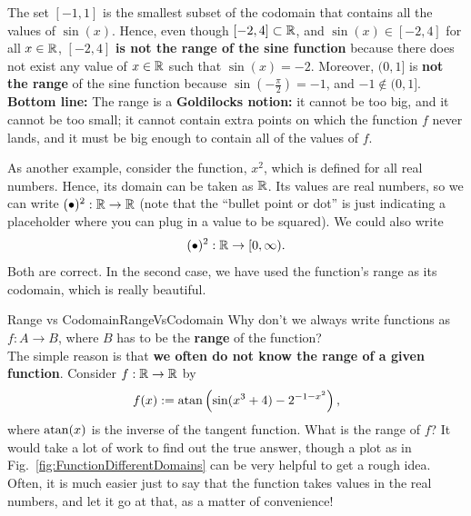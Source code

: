 The set $[-1, 1]$ is the smallest subset of the codomain that contains all the values of $\sin(x)$. Hence, even though $[-2, 4] \subset \mathbb R$, and $\sin(x) \in [-2, 4]$ for all $x\in \mathbb R$,  $[-2, 4]$ \textbf{is not the range of the sine function} because there does not exist any value of $x\in \mathbb R$ such that $\sin(x) = -2$. Moreover, $(0, 1]$ is \textbf{not the range} of the sine function because $\sin(-\frac{\pi}{2}) = -1$, and $-1 \notin (0, 1]$. \\

\textbf{Bottom line:} The range is a \textbf{Goldilocks notion:} it cannot be too big, and it cannot be too small; it cannot contain extra points on which the function $f$ never lands, and it must be big enough to contain all of the values of $f$. \Qed

\bigskip

\begin{example}
As another example, consider the function, $x^2$, which is defined for all real numbers. Hence, its domain can be taken as $\mathbb R$. Its values are real numbers, so we can write $( \bullet )^2: \mathbb R \to \mathbb R$ (note that the ``bullet point or dot'' is just indicating a placeholder where you can plug in a value to be squared). We could also write 
$$( \bullet )^2: \mathbb R \to [0, \infty). $$
Both are correct. In the second case, we have used the function's range as its codomain, which is really beautiful. \Qed
\end{example}


 \bigskip
\begin{factColor}{Range vs Codomain}{RangeVsCodomain}
Why don't we always write functions as $f:A \to B$, where $B$ has to be the \textbf{range} of the function? \\

 The simple reason is that \textbf{we often do not know the range of a given function}. Consider $f:\mathbb R \to \mathbb R$ by 
\begin{equation}
\label{eq:crazyFunction}
    f(x):= \mathrm{atan}\left( \sin(x^3 + 4) - 2^{-1 - x^2} \right),
\end{equation}
where $\mathrm{atan}(x)$ is the inverse of the tangent function. What is the range of $f$? It would take a lot of work to find out the true answer, though a plot as in Fig.~\ref{fig:FunctionDifferentDomains} can be very helpful to get a rough idea. Often, it is much easier just to say that the function takes values in the real numbers, and let it go at that, as a matter of convenience! 
\end{factColor}


